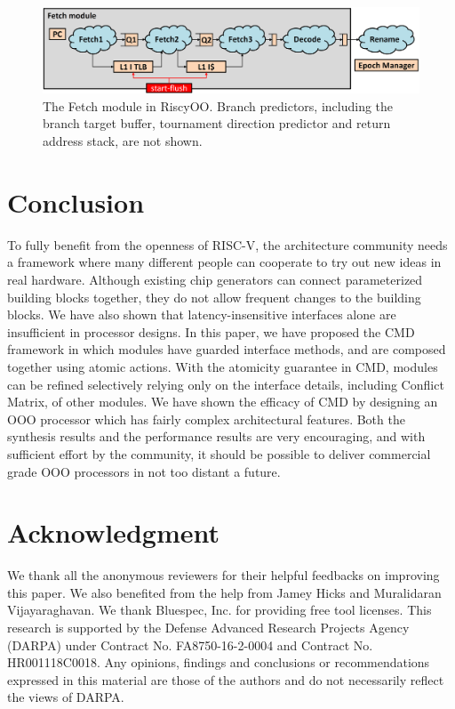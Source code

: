 \documentclass[conference]{IEEEtran}
\begin{document}
\begin{figure}[!htb]
    \centering
    \includegraphics[width=\columnwidth]{fetch.PNG}
    \caption{The Fetch module in RiscyOO. Branch predictors, including the branch target buffer, tournament direction predictor and return address stack, are not shown.}\label{fig:fetch}
\end{figure}

\section{Conclusion}\label{sec:conclude}
To fully benefit from the openness of RISC-V, the architecture community needs a framework where many different people can cooperate to try out new ideas in real hardware.
Although existing chip generators can connect parameterized building blocks together,  they do not allow frequent changes to the building blocks.
We have also shown that latency-insensitive interfaces alone are insufficient in processor designs.
In this paper, we have proposed the CMD framework in which modules have guarded interface methods, and are composed together using atomic actions. 
With the atomicity guarantee in CMD, modules can be refined selectively relying only on the interface details, including Conflict Matrix, of other modules.
We have shown the efficacy of CMD by designing an OOO processor which has fairly complex architectural features.
Both the synthesis results and the performance results are very encouraging, and with sufficient effort by the community, it should be possible to deliver commercial grade OOO processors in not too distant a future.

\section*{Acknowledgment}
We thank all the anonymous reviewers for their helpful feedbacks on improving this paper.
We also benefited from the help from Jamey Hicks and Muralidaran Vijayaraghavan.
We thank Bluespec, Inc. for providing free tool licenses.
This research is supported by the Defense Advanced Research Projects Agency (DARPA) under Contract No. FA8750-16-2-0004 and Contract No. HR001118C0018.
Any opinions, findings and conclusions or recommendations expressed in this material are those of the authors and do not necessarily reflect the views of DARPA.
\end{document}

